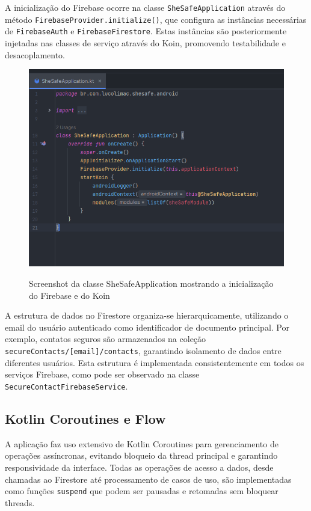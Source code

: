 A inicialização do Firebase ocorre na classe \texttt{SheSafeApplication} através do método \texttt{FirebaseProvider.initialize()}, que configura as instâncias necessárias de \texttt{FirebaseAuth} e \texttt{FirebaseFirestore}. Estas instâncias são posteriormente injetadas nas classes de serviço através do Koin, promovendo testabilidade e desacoplamento.
\begin{figure}[H]
	\centering
	\includegraphics[width=0.8\linewidth]{images/shesafe/firebase-initializer.png}\\
		\caption{Screenshot da classe SheSafeApplication mostrando a inicialização do Firebase e do Koin}
	\label{fig:shesafe_application}
\end{figure}
A estrutura de dados no Firestore organiza-se hierarquicamente, utilizando o email do usuário autenticado como identificador de documento principal. Por exemplo, contatos seguros são armazenados na coleção \texttt{secureContacts/[email]/contacts}, garantindo isolamento de dados entre diferentes usuários. Esta estrutura é implementada consistentemente em todos os serviços Firebase, como pode ser observado na classe \texttt{SecureContactFirebaseService}.
\subsection{Kotlin Coroutines e Flow}
A aplicação faz uso extensivo de Kotlin Coroutines para gerenciamento de operações assíncronas, evitando bloqueio da thread principal e garantindo responsividade da interface. Todas as operações de acesso a dados, desde chamadas ao Firestore até processamento de casos de uso, são implementadas como funções \texttt{suspend} que podem ser pausadas e retomadas sem bloquear threads.

